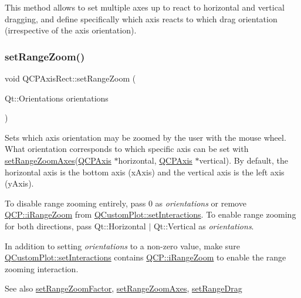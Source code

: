 This method allows to set multiple axes up to react to horizontal and vertical dragging, and define specifically which axis reacts to which drag orientation (irrespective of the axis orientation). \mbox{\label{classQCPAxisRect_a7960a9d222f1c31d558b064b60f86a31}} 
\subsubsection{\texorpdfstring{set\+Range\+Zoom()}{setRangeZoom()}}
{\footnotesize\ttfamily void Q\+C\+P\+Axis\+Rect\+::set\+Range\+Zoom (\begin{DoxyParamCaption}\item[{Qt\+::\+Orientations}]{orientations }\end{DoxyParamCaption})}

Sets which axis orientation may be zoomed by the user with the mouse wheel. What orientation corresponds to which specific axis can be set with \hyperlink{classQCPAxisRect_a9442cca2aa358405f39a64d51eca13d2}{set\+Range\+Zoom\+Axes}(\hyperlink{classQCPAxis}{Q\+C\+P\+Axis} $\ast$horizontal, \hyperlink{classQCPAxis}{Q\+C\+P\+Axis} $\ast$vertical). By default, the horizontal axis is the bottom axis (x\+Axis) and the vertical axis is the left axis (y\+Axis).

To disable range zooming entirely, pass 0 as {\itshape orientations} or remove \hyperlink{namespaceQCP_a2ad6bb6281c7c2d593d4277b44c2b037abee1e94353525a636aeaf0ba32b72e14}{Q\+C\+P\+::i\+Range\+Zoom} from \hyperlink{classQCustomPlot_a5ee1e2f6ae27419deca53e75907c27e5}{Q\+Custom\+Plot\+::set\+Interactions}. To enable range zooming for both directions, pass {\ttfamily Qt\+::\+Horizontal $\vert$ Qt\+::\+Vertical} as {\itshape orientations}.

In addition to setting {\itshape orientations} to a non-\/zero value, make sure \hyperlink{classQCustomPlot_a5ee1e2f6ae27419deca53e75907c27e5}{Q\+Custom\+Plot\+::set\+Interactions} contains \hyperlink{namespaceQCP_a2ad6bb6281c7c2d593d4277b44c2b037abee1e94353525a636aeaf0ba32b72e14}{Q\+C\+P\+::i\+Range\+Zoom} to enable the range zooming interaction.

\begin{DoxySeeAlso}{See also}
\hyperlink{classQCPAxisRect_a895d7ac745ea614e04056244b3c138ac}{set\+Range\+Zoom\+Factor}, \hyperlink{classQCPAxisRect_a9442cca2aa358405f39a64d51eca13d2}{set\+Range\+Zoom\+Axes}, \hyperlink{classQCPAxisRect_ae6aef2f7211ba6097c925dcd26008418}{set\+Range\+Drag} 
\end{DoxySeeAlso}
\mbox{\label{classQCPAxisRect_a9442cca2aa358405f39a64d51eca13d2}} 
